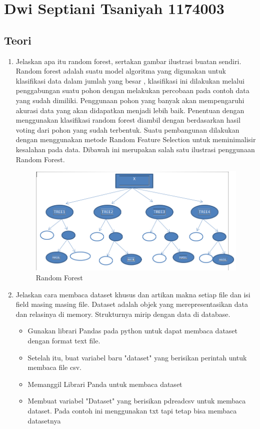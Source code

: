 \section{Dwi Septiani Tsaniyah 1174003}

\subsection{Teori}
\begin{enumerate}
\item Jelaskan apa itu random forest, sertakan gambar ilustrasi buatan sendiri.
Random forest adalah suatu model algoritma yang digunakan untuk klasifikasi data dalam jumlah yang besar , klasifikasi ini dilakukan melalui penggabungan suatu pohon dengan melakukan percobaan pada contoh data yang sudah dimiliki. Penggunaan pohon yang banyak akan mempengaruhi akurasi data yang akan didapatkan menjadi lebih baik. Penentuan dengan menggunakan klasifikasi random forest diambil dengan berdasarkan hasil voting dari pohon yang sudah terbentuk. Suatu pembangunan dilakukan dengan menggunakan metode Random Feature Selection untuk meminimalisir kesalahan pada data.
Dibawah ini merupakan salah satu ilustrasi penggunaan Random Forest.
\begin{figure}[ht]
\centering
\includegraphics[scale=0.5]{figures/1174003/3/teori1.PNG}
\caption{Random Forest}
\label{contoh}
\end{figure}

\item Jelaskan cara membaca dataset khusus dan artikan makna setiap file dan isi field masing masing file.
Dataset adalah objek yang merepresentasikan data dan relasinya di memory. Strukturnya mirip dengan data di database.
\begin{itemize}
\item
Gunakan librari Pandas pada python untuk dapat membaca dataset dengan format text file.
\item
Setelah itu, buat variabel baru "dataset" yang berisikan perintah untuk membaca file csv.
\item
Memanggil Librari Panda untuk membaca dataset
\item
Membuat variabel "Dataset" yang berisikan pdreadcsv untuk membaca dataset. Pada contoh ini menggunakan txt tapi tetap bisa membaca datasetnya
\end{itemize}


\end{enumerate}

